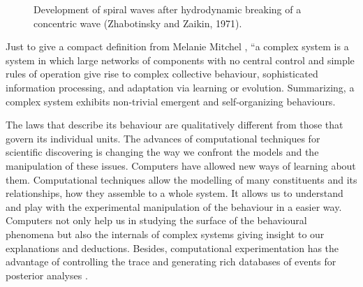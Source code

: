 \documentclass[11pt,oneside,a4paper,openright]{report}
\begin{document}
\begin{figure}[h]
\centering
\setlength\fboxsep{0pt}
\setlength\fboxrule{0.5pt}
\caption{ Development of spiral waves after hydrodynamic breaking of a concentric wave (Zhabotinsky and Zaikin, 1971).}
\label{fig:ZhaboZaikin_1}
\end{figure}





Just to give a compact definition from Melanie Mitchel \cite{MelanieMitchell2009}, ``a complex system is a system in
which large networks of components with no central control and simple rules of operation give rise to complex collective behaviour, sophisticated information processing, and adaptation via learning or evolution. Summarizing, a complex system exhibits non-trivial emergent and self-organizing behaviours.

The laws that describe its behaviour are qualitatively different from those that govern its individual units.
The advances of computational techniques for scientific discovering is changing the way we confront the models 
and the manipulation of these issues. Computers have allowed new ways of learning about them. Computational techniques 
allow the modelling of many constituents and its relationships, how they assemble to a whole system. It allows us 
to understand and play with the experimental manipulation of the behaviour in a easier way. Computers not only help 
us in studying the surface of the behavioural phenomena but also the internals of complex systems giving insight 
to our explanations and deductions. Besides, computational experimentation has the advantage of controlling the trace 
and generating rich databases of events for posterior analyses \cite{Vicsek2002}.
\end{document}
